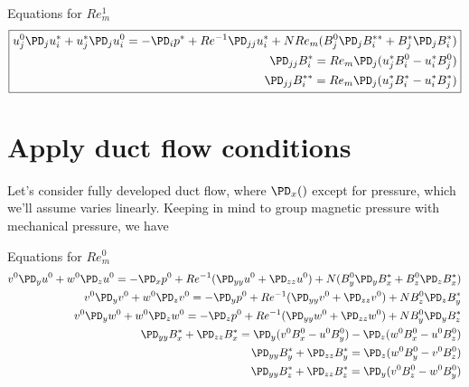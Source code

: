 \documentclass[11pt]{article}
\begin{document}
Equations for $Re_m^1$
\begin{equation}\boxed{\begin{aligned}
u_j^0 \PD_j u_i^* + u_j^* \PD_j u_i^0 = -\PD_i p^*+ Re^{-1} \PD_{jj} u_i^* + N Re_m ( B_j^0 \PD_j B_i^{**} + B_j^* \PD_j B_i^* ) \\
\PD_{jj} B_i^{*}  = Re_m \PD_j (u_j^* B_i^{0} - u_i^* B_j^{0}) \\
\PD_{jj} B_i^{**} = Re_m \PD_j (u_j^* B_i^{*} - u_i^* B_j^{*}) \\
\end{aligned}}\end{equation}

\section{Apply duct flow conditions}
Let's consider fully developed duct flow, where $\PD_x()$ except for pressure, which we'll assume varies linearly. 
Keeping in mind to group magnetic pressure with mechanical pressure, we have

Equations for $Re_m^0$
\begin{equation}\begin{aligned}
v^0 \PD_y u^0 + w^0 \PD_z u^0 = -\PD_x p^0 + Re^{-1} (\PD_{yy} u^0 + \PD_{zz} u^0 ) + N (B_y^0 \PD_y B_x^* + B_z^0 \PD_z B_x^*) \\
v^0 \PD_y v^0 + w^0 \PD_z v^0 = -\PD_y p^0 + Re^{-1} (\PD_{yy} v^0 + \PD_{zz} v^0 ) + N  B_z^0 \PD_z B_y^* \\
v^0 \PD_y w^0 + w^0 \PD_z w^0 = -\PD_z p^0 + Re^{-1} (\PD_{yy} w^0 + \PD_{zz} w^0 ) + N  B_y^0 \PD_y B_z^* \\
\PD_{yy} B_x^* + \PD_{zz} B_x^* = \PD_y ( v^0 B_x^0 - u^0 B_y^0) - \PD_z ( w^0 B_x^0 - u^0 B_z^0) \\
\PD_{yy} B_y^* + \PD_{zz} B_y^* = \PD_z ( w^0 B_y^0 - v^0 B_z^0) \\
\PD_{yy} B_z^* + \PD_{zz} B_z^* = \PD_y ( v^0 B_z^0 - w^0 B_y^0) \\
\end{aligned}\end{equation}
\end{document}

